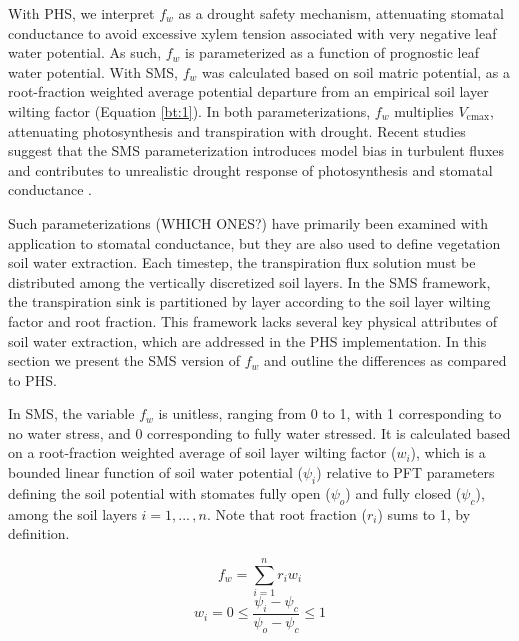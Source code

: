 \documentclass[draft,linenumbers]{agujournal}
\begin{document}
    With PHS, we interpret $f_w$ as a drought safety mechanism, attenuating stomatal conductance to avoid
    excessive xylem tension associated with very negative leaf water potential.
    As such, $f_w$ is parameterized as a function of prognostic leaf water potential.
    With SMS, $f_w$ was calculated based on soil matric potential, 
    as a root-fraction weighted average potential departure from an empirical soil layer wilting factor (Equation \ref{bt:1}).
    In both parameterizations, $f_w$ multiplies $V_{\text{cmax}}$, attenuating photosynthesis and transpiration with drought.
    Recent studies suggest that the SMS parameterization introduces model bias in turbulent fluxes \citep{bonan2014}
    and contributes to unrealistic drought response of photosynthesis and stomatal conductance \citep{powell2013}.

    
    Such parameterizations (WHICH ONES?) have primarily been examined with application to stomatal conductance, but they are also used to define vegetation soil water extraction. 
    Each timestep, the transpiration flux solution must be distributed among the vertically discretized soil layers.
    In the SMS framework, the transpiration sink is partitioned by layer according to the soil layer wilting factor and root fraction.
    This framework lacks several key physical attributes of soil water extraction, which are addressed in the PHS implementation.
    In this section we present the SMS version of $f_w$ and outline the differences as compared to PHS.
    
    In SMS, the variable $f_w$ is unitless, ranging from 0 to 1, with 1 corresponding to no water stress, and 0 corresponding to fully water stressed. 
    It is calculated based on a root-fraction weighted average of soil layer wilting factor ($w_i$), which is a bounded linear 
    function of soil water potential ($\psi_i$) relative to PFT parameters defining the soil potential with stomates fully open ($
    \psi_{o}$) and fully closed ($\psi_{c}$), among the soil layers $i=1,...\,,n$. Note that root fraction ($r_i$) sums to 1, by definition.
    
    \begin{linenomath*}
    \begin{equation} f_w = \sum_{i=1}^{n}{r_iw_i}
    \label{bt:1}
    \end{equation}
    \begin{equation} 
    \label{bt:2}
    w_i=0 \leq \dfrac{\psi_i-\psi_{c}}{\psi_{o}-\psi_{c}} \leq 1
    \end{equation}
    \end{linenomath*}
    
\end{document}
